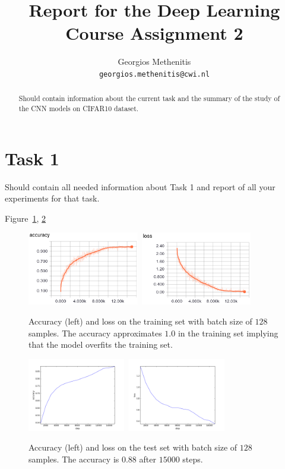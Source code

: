 \documentclass{article}
\title{Report for the Deep Learning Course Assignment 2 }
\author{
  Georgios Methenitis \\
  \texttt{georgios.methenitis@cwi.nl}
}
\begin{document}

\maketitle

\begin{abstract}
Should contain information about the current task and the summary of the study of the CNN models on CIFAR10 dataset.

\end{abstract}

\section{Task 1}
Should contain all needed information about Task 1 and report of all your experiments for that task.

Figure~\ref{fig:1}, \ref{fig:2}


\begin{figure}[h!]
\centering
\includegraphics[height=3.2cm]{acc1.png}\	
\includegraphics[height=3.2cm]{loss1.png}
\caption{Accuracy (left) and loss on the training set with batch size of $128$ samples. The accuracy approximates $1.0$ in the training set implying that the model overfits the training set.}
\label{fig:1}
\end{figure}


\begin{figure}[h!]
\centering
\includegraphics[height=3.2cm]{acc2.png}\	
\includegraphics[height=3.2cm]{loss2.png}
\caption{Accuracy (left) and loss on the test set with batch size of $128$ samples. The accuracy is $0.88$ after $15000$ steps.}
\label{fig:2}
\end{figure}
\end{document}
